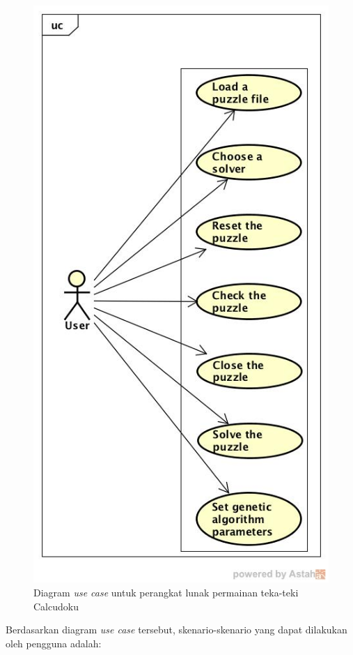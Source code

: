 \begin{figure}
\centering
\captionsetup{justification=centering}
\includegraphics[scale=0.5]{Gambar/Analisis/DiagramUseCase}
\caption[Diagram \textit{use case} untuk perangkat lunak permainan teka-teki Calcudoku]{Diagram \textit{use case} untuk perangkat lunak permainan teka-teki Calcudoku}
\label{fig:analisisusecase}
\end{figure}

Berdasarkan diagram \textit{use case} tersebut, skenario-skenario yang dapat dilakukan oleh pengguna adalah:

